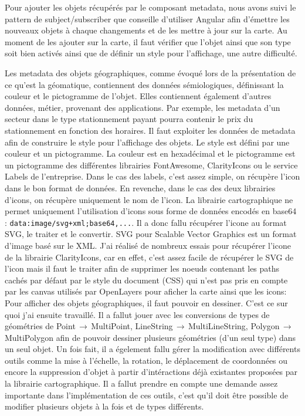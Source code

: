 \documentclass{rapportUHA40}
\begin{document}
Pour ajouter les objets récupérés par le composant metadata, nous avons suivi
le pattern de subject/subscriber que conseille d'utiliser Angular afin
d'émettre les nouveaux objets à chaque changements et de les mettre à jour sur
la carte. Au moment de les ajouter sur la carte, il faut vérifier que l'objet
ainsi que son type soit bien activés ainsi que de définir un style pour
l'affichage, une autre difficulté.

Les metadata des objets géographiques, comme évoqué lors de la présentation de
ce qu'est la géomatique, contiennent des données sémiologiques, définissant la
couleur et le pictogramme de l'objet. Elles contiennent également d'autres
données, métier, provenant des applications. Par exemple, les metadata d'un
secteur dans le type stationnement payant pourra contenir le prix du
stationnement en fonction des horaires. Il faut exploiter les données de
metadata afin de construire le style pour l'affichage des objets. Le style est
défini par une couleur et un pictogramme. La couleur est en hexadécimal et le
pictogramme est un pictogramme des différentes librairies FontAwesome,
ClarityIcons ou le service Labels de l'entreprise. Dans le cas des labels,
c'est assez simple, on récupère l'icon dans le bon format de données. En
revenche, dans le cas des deux librairies d'icons, on récupère uniquement le
nom de l'icon. La librairie cartographique ne permet uniquement l'utilisation
d'icons sous forme de données encodés en base64 :
\texttt{data:image/svg+xml;base64,...}. Il a donc fallu récupérer
l'icone au format SVG, le traiter et le convertir. SVG pour \og Scalable Vector
Graphics \fg{} est un format d'image basé sur le XML\@. J'ai réalisé de
nombreux essais pour récupérer l'icone de la librairie ClarityIcons, car en
effet, c'est assez facile de récupérer le SVG de l'icon mais il faut le traiter
afin de supprimer les noeuds contenant les paths cachés par défaut par le style
du document (CSS) qui n'est pas pris en compte par les canvas utilisés par
OpenLayers pour aficher la carte ainsi que les icons:
 \\

Pour afficher des objets géographiques, il faut pouvoir en dessiner. C'est ce
sur quoi j'ai ensuite travaillé. Il a fallut jouer avec les conversions de
types de géométries de Point$\,\to\,$MultiPoint,
LineString$\,\to\,$MultiLineString, Polygon$\,\to\,$MultiPolygon afin de
pouvoir dessiner plusieurs géométries (d'un seul type) dans un seul objet. Un
fois fait, il a égelement fallu gérer la modification avec différents outils
comme la mise à l'échelle, la rotation, le déplacement de coordonnées ou encore
la suppression d'objet à partir d'intéractions déjà existantes proposées par la
librairie cartographique. Il a fallut prendre en compte une demande assez
importante dans l'implémentation de ces outils, c'est qu'il doit être possible
de modifier plusieurs objets à la fois et de types différents.
\end{document}

